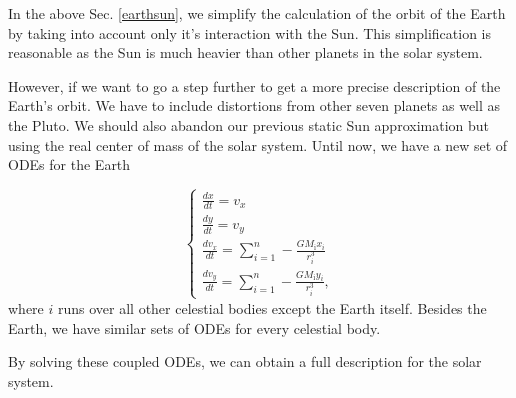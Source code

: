 In the above Sec. \ref{earthsun}, we simplify the calculation of the orbit of the Earth by taking into account only it's interaction with the Sun. 
This simplification is reasonable as the Sun is much heavier than other planets in the solar system. 

However, if we want to go a step further to get a more precise description of the Earth's orbit. 
We have to include distortions from other seven planets as well as the Pluto.
We should also abandon our previous static Sun approximation but using the real center of mass of the solar system.
Until now, we have a new set of ODEs for the Earth

\begin{equation}
	\left\{  
             \begin{array}{lr}  
             	\frac{dx}{dt} = v_x \\
				\frac{dy}{dt} = v_y \\
            	\frac{dv_x}{dt} = \sum\limits_{i=1}^{n}-\frac{GM_{\mathrm{i}}x_i}{r_i^3} \\
				\frac{dv_y}{dt} = \sum\limits_{i=1}^{n}-\frac{GM_{\mathrm{i}}y_i}{r_i^3},
			\end{array}  
	\right. 	
\end{equation}
where $i$ runs over all other celestial bodies except the Earth itself. 
Besides the Earth, we have similar sets of ODEs for every celestial body.

By solving these coupled ODEs, we can obtain a full description for the solar system.
